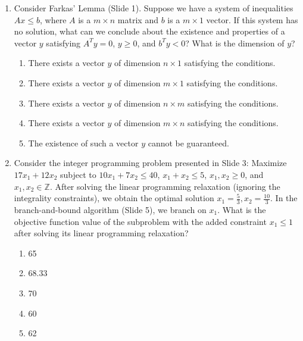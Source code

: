 \documentclass{article}%
\begin{document}
\begin{enumerate}
\item Consider Farkas' Lemma (Slide 1).  Suppose we have a system of inequalities $Ax \le b$, where $A$ is a $m \times n$ matrix and $b$ is a $m \times 1$ vector.  If this system has no solution, what can we conclude about the existence and properties of a vector $y$ satisfying $A^T y = 0$, $y \ge 0$, and $b^T y < 0$?  What is the dimension of $y$?%
\begin{enumerate}%
\item There exists a vector $y$ of dimension $n \times 1$ satisfying the conditions.%
\item There exists a vector $y$ of dimension $m \times 1$ satisfying the conditions.%
\item There exists a vector $y$ of dimension $n \times m$ satisfying the conditions.%
\item There exists a vector $y$ of dimension $m \times n$ satisfying the conditions.%
\item The existence of such a vector $y$ cannot be guaranteed.%
\end{enumerate}%
\vspace{1em}%
\item Consider the integer programming problem presented in Slide 3: Maximize $17x_1 + 12x_2$ subject to $10x_1 + 7x_2 \le 40$, $x_1 + x_2 \le 5$, $x_1, x_2 \ge 0$, and $x_1, x_2 \in \mathbb{Z}$.  After solving the linear programming relaxation (ignoring the integrality constraints), we obtain the optimal solution $x_1 = \frac{5}{3}, x_2 = \frac{10}{3}$. In the branch-and-bound algorithm (Slide 5), we branch on $x_1$. What is the objective function value of the subproblem with the added constraint $x_1 \le 1$ after solving its linear programming relaxation?%
\begin{enumerate}%
\item 65%
\item 68.33%
\item 70%
\item 60%
\item 62%
\end{enumerate}%
\vspace{1em}%
\end{enumerate}

%
\newpage%
\end{document}
